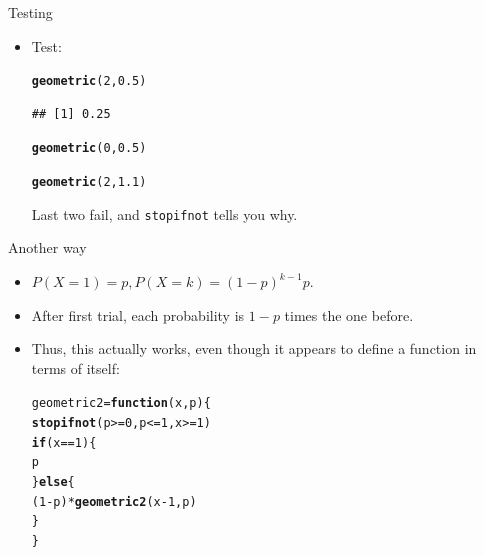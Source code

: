 \documentclass[unknownkeysallowed]{beamer}\usepackage[]{graphicx}\usepackage[]{color}
\makeatletter
\newcommand{\hlnum}[1]{\textcolor[rgb]{0.686,0.059,0.569}{#1}}%
\newcommand{\hlopt}[1]{\textcolor[rgb]{0,0,0}{#1}}%
\newcommand{\hlstd}[1]{\textcolor[rgb]{0.345,0.345,0.345}{#1}}%
\newcommand{\hlkwa}[1]{\textcolor[rgb]{0.161,0.373,0.58}{\textbf{#1}}}%
\newcommand{\hlkwb}[1]{\textcolor[rgb]{0.69,0.353,0.396}{#1}}%
\newcommand{\hlkwc}[1]{\textcolor[rgb]{0.333,0.667,0.333}{#1}}%
\newcommand{\hlkwd}[1]{\textcolor[rgb]{0.737,0.353,0.396}{\textbf{#1}}}%
\newenvironment{kframe}{%
 \def\at@end@of@kframe{}%
 \ifinner\ifhmode%
  \def\at@end@of@kframe{\end{minipage}}%
  \begin{minipage}{\columnwidth}%
 \fi\fi%
 \def\FrameCommand##1{\hskip\@totalleftmargin \hskip-\fboxsep
 \colorbox{shadecolor}{##1}\hskip-\fboxsep
     \hskip-\linewidth \hskip-\@totalleftmargin \hskip\columnwidth}%
 \MakeFramed {\advance\hsize-\width
   \@totalleftmargin\z@ \linewidth\hsize
   \@setminipage}}%
 {\par\unskip\endMakeFramed%
 \at@end@of@kframe}
\newenvironment{knitrout}{}{} %
\makeatother
\begin{document}
\begin{frame}[fragile]{Testing}
  \begin{itemize}
\item Test:
  
\begin{knitrout}
\color{fgcolor}\begin{kframe}
\begin{alltt}
\hlkwd{geometric}\hlstd{(}\hlnum{2}\hlstd{,}\hlnum{0.5}\hlstd{)}
\end{alltt}
\begin{verbatim}
## [1] 0.25
\end{verbatim}
\begin{alltt}
\hlkwd{geometric}\hlstd{(}\hlnum{0}\hlstd{,}\hlnum{0.5}\hlstd{)}
\end{alltt}


{\ttfamily\noindent\bfseries\color{errorcolor}{\#\# Error: x >= 1 is not TRUE}}\begin{alltt}
\hlkwd{geometric}\hlstd{(}\hlnum{2}\hlstd{,}\hlnum{1.1}\hlstd{)}
\end{alltt}


{\ttfamily\noindent\bfseries\color{errorcolor}{\#\# Error: p <= 1 is not TRUE}}\end{kframe}
\end{knitrout}

Last two fail, and \texttt{stopifnot} tells you why.
  \end{itemize}
\end{frame}

\begin{frame}[fragile]{Another way}
  
  \begin{itemize}
  \item $P(X=1)=p, P(X=k)=(1-p)^{k-1} p$.
  \item After first trial, each probability is $1-p$ times the one
    before.
  \item Thus, this actually works, even though it appears to define a
    function in terms of itself:
    
\begin{knitrout}
\color{fgcolor}\begin{kframe}
\begin{alltt}
\hlstd{geometric2}\hlkwb{=}\hlkwa{function}\hlstd{(}\hlkwc{x}\hlstd{,}\hlkwc{p}\hlstd{) \{}
  \hlkwd{stopifnot}\hlstd{(p}\hlopt{>=}\hlnum{0}\hlstd{,p}\hlopt{<=}\hlnum{1}\hlstd{,x}\hlopt{>=}\hlnum{1}\hlstd{)}
  \hlkwa{if} \hlstd{(x}\hlopt{==}\hlnum{1}\hlstd{) \{}
    \hlstd{p}
  \hlstd{\}} \hlkwa{else} \hlstd{\{}
    \hlstd{(}\hlnum{1}\hlopt{-}\hlstd{p)}\hlopt{*}\hlkwd{geometric2}\hlstd{(x}\hlopt{-}\hlnum{1}\hlstd{,p)}
  \hlstd{\}}
\hlstd{\}}
\end{alltt}
\end{kframe}
\end{knitrout}
  \end{itemize}
  
\end{frame}
\end{document}
